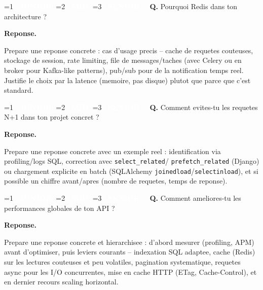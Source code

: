 \documentclass[11pt,a4paper]{article}
\newcommand{\badgeJ}{\textcolor{white}{\colorbox{junior}{\small\bfseries\ JUNIOR\ }}}
\newcommand{\badgeM}{\textcolor{white}{\colorbox{mid}{\small\bfseries\ MID\ }}}
\newcommand{\badgeS}{\textcolor{white}{\colorbox{senior}{\small\bfseries\ SENIOR\ }}}
\newcounter{qcount}
\newenvironment{qa}[2]{%
  \stepcounter{qcount}%
  \par\vspace{6pt}%
  \noindent\colorbox{qbg}{\parbox{\dimexpr\linewidth-12pt}{\vspace{2pt}%
  \ifnum#1=1 \badgeJ\fi\ifnum#1=2 \badgeM\fi\ifnum#1=3 \badgeS\fi
  \ \textbf{Q\theqcount.} #2\vspace{2pt}}}\par\vspace{4pt}%
  \noindent\textbf{\color{accent}Reponse.}\ \ignorespaces
}{%
  \par\vspace{8pt}%
}
\begin{document}
\begin{qa}{2}{Pourquoi Redis dans ton architecture ?}
Prepare une reponse concrete : cas d'usage precis -- cache de requetes
couteuses, stockage de session, rate limiting, file de messages/taches
(avec Celery ou en broker pour Kafka-like patterns), pub/sub pour de la
notification temps reel. Justifie le choix par la latence (memoire, pas
disque) plutot que \og{}parce que c'est standard\fg{}.
\end{qa}

\begin{qa}{3}{Comment evites-tu les requetes N+1 dans ton projet concret ?}
Prepare une reponse concrete avec un exemple reel : identification via
profiling/logs SQL, correction avec \texttt{select\_related}/
\texttt{prefetch\_related} (Django) ou chargement explicite en batch
(SQLAlchemy \texttt{joinedload}/\texttt{selectinload}), et si possible un
chiffre avant/apres (nombre de requetes, temps de reponse).
\end{qa}

\begin{qa}{3}{Comment ameliores-tu les performances globales de ton API ?}
Prepare une reponse concrete et hierarchisee : d'abord mesurer (profiling,
APM) avant d'optimiser, puis leviers courants -- indexation SQL adaptee,
cache (Redis) sur les lectures couteuses et peu volatiles, pagination
systematique, requetes async pour les I/O concurrentes, mise en cache HTTP
(ETag, Cache-Control), et en dernier recours scaling horizontal.
\end{qa}
\end{document}
